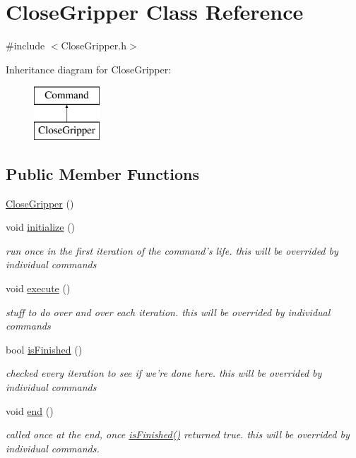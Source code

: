\hypertarget{classCloseGripper}{\section{Close\-Gripper Class Reference}
\label{classCloseGripper}
}


{\ttfamily \#include $<$Close\-Gripper.\-h$>$}

Inheritance diagram for Close\-Gripper\-:\begin{figure}[H]
\begin{center}
\leavevmode
\includegraphics[height=2.000000cm]{classCloseGripper}
\end{center}
\end{figure}
\subsection*{Public Member Functions}
\begin{DoxyCompactItemize}
\item 
\hyperlink{classCloseGripper_ac95731a5048d22a12eb77f85fa4f254a}{Close\-Gripper} ()
\item 
void \hyperlink{classCloseGripper_a91b194b7afe5bdc70ccb97fb6a77e956}{initialize} ()
\begin{DoxyCompactList}\small\item\em run once in the first iteration of the command's life. this will be overrided by individual commands \end{DoxyCompactList}\item 
void \hyperlink{classCloseGripper_a11b489ca1de2f1be5cb82f47345360d8}{execute} ()
\begin{DoxyCompactList}\small\item\em stuff to do over and over each iteration. this will be overrided by individual commands \end{DoxyCompactList}\item 
bool \hyperlink{classCloseGripper_afab2b93b62904d6fd70a794a9f954abf}{is\-Finished} ()
\begin{DoxyCompactList}\small\item\em checked every iteration to see if we're done here. this will be overrided by individual commands \end{DoxyCompactList}\item 
void \hyperlink{classCloseGripper_a06ab30ca6e30278ab74e973e268c5d97}{end} ()
\begin{DoxyCompactList}\small\item\em called once at the end, once \hyperlink{classCloseGripper_afab2b93b62904d6fd70a794a9f954abf}{is\-Finished()} returned true. this will be overrided by individual commands. \end{DoxyCompactList}\end{DoxyCompactItemize}

